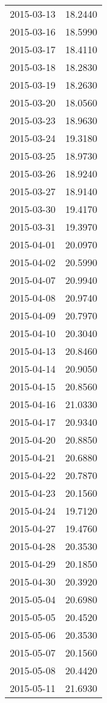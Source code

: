 \begin{tabular}{lr}
2015-03-13 &     18.2440 \\
2015-03-16 &     18.5990 \\
2015-03-17 &     18.4110 \\
2015-03-18 &     18.2830 \\
2015-03-19 &     18.2630 \\
2015-03-20 &     18.0560 \\
2015-03-23 &     18.9630 \\
2015-03-24 &     19.3180 \\
2015-03-25 &     18.9730 \\
2015-03-26 &     18.9240 \\
2015-03-27 &     18.9140 \\
2015-03-30 &     19.4170 \\
2015-03-31 &     19.3970 \\
2015-04-01 &     20.0970 \\
2015-04-02 &     20.5990 \\
2015-04-07 &     20.9940 \\
2015-04-08 &     20.9740 \\
2015-04-09 &     20.7970 \\
2015-04-10 &     20.3040 \\
2015-04-13 &     20.8460 \\
2015-04-14 &     20.9050 \\
2015-04-15 &     20.8560 \\
2015-04-16 &     21.0330 \\
2015-04-17 &     20.9340 \\
2015-04-20 &     20.8850 \\
2015-04-21 &     20.6880 \\
2015-04-22 &     20.7870 \\
2015-04-23 &     20.1560 \\
2015-04-24 &     19.7120 \\
2015-04-27 &     19.4760 \\
2015-04-28 &     20.3530 \\
2015-04-29 &     20.1850 \\
2015-04-30 &     20.3920 \\
2015-05-04 &     20.6980 \\
2015-05-05 &     20.4520 \\
2015-05-06 &     20.3530 \\
2015-05-07 &     20.1560 \\
2015-05-08 &     20.4420 \\
2015-05-11 &     21.6930 \\

\end{tabular}
